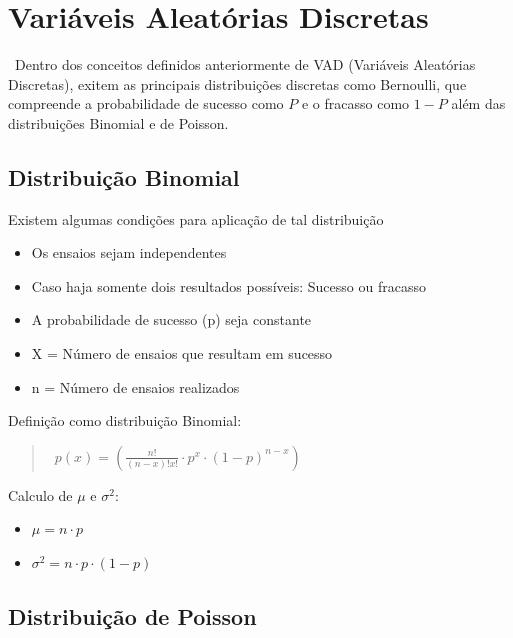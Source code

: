 \documentclass{article}
\begin{document}
    \newpage

\section{Variáveis Aleatórias Discretas}

  \ Dentro dos conceitos definidos anteriormente de VAD (Variáveis Aleatórias Discretas), exitem as principais distribuições discretas como Bernoulli, que 
  compreende a probabilidade de sucesso como $ P $ e o fracasso como $ 1-P $ além das distribuições Binomial e de Poisson.
  
  \subsection{Distribuição Binomial}

  \begin{multicols}{2}

  Existem algumas condições para aplicação de tal distribuição
  \begin{itemize}
    \item Os ensaios sejam independentes
    \item Caso haja somente dois resultados possíveis: Sucesso ou fracasso
    \item A probabilidade de sucesso (p) seja constante
    \item X = Número de ensaios que resultam em sucesso
    \item n = Número de ensaios realizados
  \end{itemize}

  Definição como distribuição Binomial:

  \begin{Large}
  \begin{quote}
    \hbox{
    $ p(x) = \left( \frac{n!}{(n-x)!x!} \cdot p^x \cdot (1-p)^{n-x} \right)$}
  \end{quote}
  \end{Large}
  
  Calculo de $ \mu $ e $ \sigma^2 $:
 
  \begin{itemize}
    \item $ \mu = n \cdot p $
    \item $ \sigma^2 = n \cdot p \cdot (1 - p) $
  \end{itemize}  
  \end{multicols}

  \subsection{Distribuição de Poisson}
\end{document}
